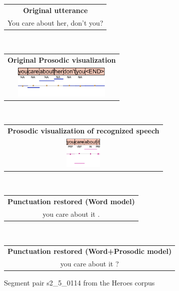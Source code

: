 \hfill
\hfill
\begin{figure}[h]
    \centering
    \begin{minipage}[t]{0.5\textwidth}
    \begin{tabular}{c}
    \textbf{Original utterance}\\
    You care about her, don't you? \\
    \end{tabular}
    \end{minipage}
    \\
    \begin{minipage}[t]{0.5\textwidth}
    \begin{tabular}{c}
    \textbf{Original Prosodic visualization}\\
    \includegraphics[height=1.5cm]{img/s2_5_0114.png} \\
    \end{tabular}
    \end{minipage}
    \\
    \begin{minipage}[t]{0.5\textwidth}
    \begin{tabular}{c}
    \textbf{Prosodic visualization of recognized speech}\\
    \includegraphics[height=1.5cm]{img/s2_5_0114_asr.png} \\
    \end{tabular}
    \end{minipage}
    \\
    \begin{minipage}[t]{0.5\textwidth}
    \begin{tabular}{c}
    \textbf{Punctuation restored (Word model)}\\
    you care about it .  \\
    \end{tabular}
    \end{minipage}
    \\
    \begin{minipage}[t]{0.5\textwidth}
    \begin{tabular}{c}
    \textbf{Punctuation restored (Word+Prosodic model)}\\
    you care about it ? \\
    \end{tabular}
    \end{minipage}
    
    \caption{Segment pair s2\_5\_0114 from the Heroes corpus}
    \label{figure:heroes_pp_3}
\end{figure}


